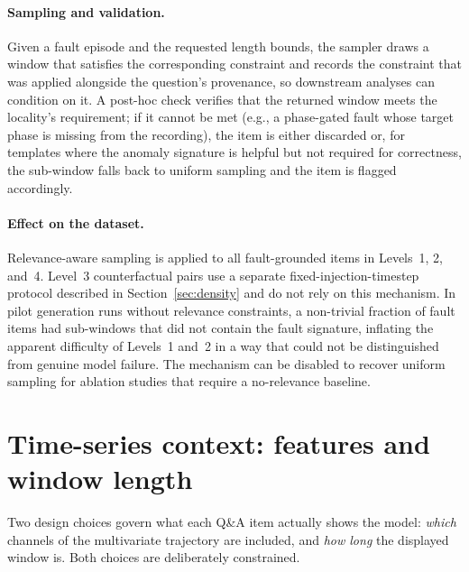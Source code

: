 \paragraph{Sampling and validation.} Given a fault episode and the requested length bounds, the sampler draws a window that satisfies the corresponding constraint and records the constraint that was applied alongside the question's provenance, so downstream analyses can condition on it. A post-hoc check verifies that the returned window meets the locality's requirement; if it cannot be met (e.g., a phase-gated fault whose target phase is missing from the recording), the item is either discarded or, for templates where the anomaly signature is helpful but not required for correctness, the sub-window falls back to uniform sampling and the item is flagged accordingly.

\paragraph{Effect on the dataset.} Relevance-aware sampling is applied to all fault-grounded items in Levels~1, 2, and~4. Level~3 counterfactual pairs use a separate fixed-injection-timestep protocol described in Section~\ref{sec:density} and do not rely on this mechanism. In pilot generation runs without relevance constraints, a non-trivial fraction of fault items had sub-windows that did not contain the fault signature, inflating the apparent difficulty of Levels~1 and~2 in a way that could not be distinguished from genuine model failure. The mechanism can be disabled to recover uniform sampling for ablation studies that require a no-relevance baseline.

\section{Time-series context: features and window length}
\label{app:context_construction}

Two design choices govern what each Q\&A item actually shows the model: \emph{which} channels of the multivariate trajectory are included, and \emph{how long} the displayed window is. Both choices are deliberately constrained.

